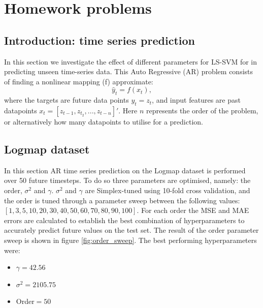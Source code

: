 \documentclass{article}
\begin{document}
\section{Homework problems}
    \subsection{Introduction: time series prediction}
        In this section we investigate the effect of different parameters for LS-SVM for in predicting unseen time-series data. This Auto Regressive (AR) problem consists of finding a nonlinear mapping (f) approximate: 
        \begin{equation}
            \hat{y}_t = f(x_t), 
        \end{equation}
        where the targets are future data points $y_t = z_t$, and input features are past datapoints $x_t=[z_{t-1}, z_{t_2}, ... ,  z_{t-n}]'$. Here $n$ represents the order of the problem, or alternatively how many datapoints to utilise for a prediction. 
        
    \subsection{Logmap dataset}
        In this section AR time series prediction on the Logmap dataset is performed over 50 future timesteps. To do so three parameters are optimised, namely: the order, $\sigma^2$ and $\gamma$. $\sigma^2$ and $\gamma$ are Simplex-tuned using 10-fold cross validation, and the order is tuned through a parameter sweep between the following values: \newline $[1, 3, 5, 10, 20, 30, 40, 50, 60, 70, 80, 90, 100]$.
         For each order the MSE and MAE errors are calculated to establish the best combination of hyperparameters to accurately predict future values on the test set. The result of the order parameter sweep is shown in figure \ref{fig:order_sweep}. The best performing hyperparameters were: 
        \begin{itemize}
            \item $\gamma =  42.56$
            \item $\sigma^2 =  2105.75$
            \item Order$= 50$
        \end{itemize}
        
\end{document}
